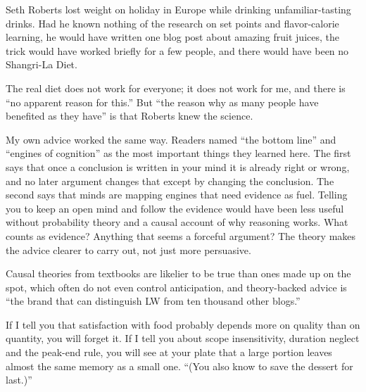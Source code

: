 
Seth Roberts lost weight on holiday in Europe while drinking unfamiliar-tasting drinks. Had he known nothing of the research on set points and flavor-calorie learning, he would have written one blog post about amazing fruit juices, the trick would have worked briefly for a few people, and there would have been no Shangri-La Diet.

The real diet does not work for everyone; it does not work for me, and there is ``no apparent reason for this.'' But ``the reason why as many people have benefited as they have'' is that Roberts knew the science. 

My own advice worked the same way. Readers named ``the bottom line'' and ``engines of cognition'' as the most important things they learned here. The first says that once a conclusion is written in your mind it is already right or wrong, and no later argument changes that except by changing the conclusion. The second says that minds are mapping engines that need evidence as fuel.  Telling you to keep an open mind and follow the evidence would have been less useful without probability theory and a causal account of why reasoning works. What counts as evidence? Anything that seems a forceful argument? The theory makes the advice clearer to carry out, not just more persuasive.

Causal theories from textbooks are likelier to be true than ones made up on the spot, which often do not even control anticipation, and theory-backed advice is ``the brand that can distinguish LW from ten thousand other blogs.''

If I tell you that satisfaction with food probably depends more on quality than on quantity, you will forget it. If I tell you about scope insensitivity, duration neglect and the peak-end rule, you will see at your plate that a large portion leaves almost the same memory as a small one. ``(You also know to save the dessert for last.)'' 

